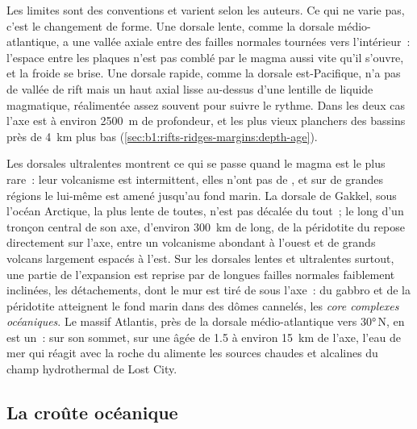 Les limites sont des conventions et varient selon les auteurs. Ce qui ne varie pas, c'est le
changement de forme. Une dorsale lente, comme la dorsale médio-atlantique, a
une vallée axiale entre des failles normales tournées vers l'intérieur~: l'espace entre les
plaques n'est pas comblé par le magma aussi vite qu'il s'ouvre, et la  froide
se brise. Une dorsale rapide, comme la dorsale est-Pacifique, n'a pas de vallée de rift mais un
haut axial lisse au-dessus d'une lentille de liquide magmatique, réalimentée assez souvent pour suivre le rythme.
Dans les deux cas l'axe est à environ \qty{2500}{m} de profondeur, et les plus vieux planchers des
bassins près de \qty{4}{km} plus bas (\cref{sec:b1:rifts-ridges-margins:depth-age}).

Les dorsales ultralentes montrent ce qui se passe quand le magma est le plus rare~: leur volcanisme est
intermittent, elles n'ont pas de , et sur de grandes régions le 
lui-même est amené jusqu'au fond marin. La dorsale de Gakkel, sous l'océan Arctique, la plus lente de toutes, n'est pas décalée
du tout~; le long d'un tronçon central de
son axe, d'environ \qty{300}{km} de long, de la péridotite du  repose directement sur l'axe,
entre un volcanisme abondant à l'ouest et de grands volcans largement espacés à
l'est. Sur les dorsales lentes et ultralentes surtout, une partie de l'expansion est
reprise par de longues failles normales faiblement inclinées, les détachements, dont le mur est
tiré de sous l'axe~: du gabbro et de la péridotite atteignent le fond marin dans des
dômes cannelés, les \emph{core complexes océaniques}. Le massif Atlantis, près de
la dorsale médio-atlantique vers \ang{30}\,N, en est un~: sur son sommet, sur une 
âgée de \qty{1.5}{\Ma} à environ \qty{15}{km} de l'axe, l'eau de mer qui réagit avec
la roche du  alimente les sources chaudes et alcalines du champ
hydrothermal de Lost City.

\subsection*{La croûte océanique}

